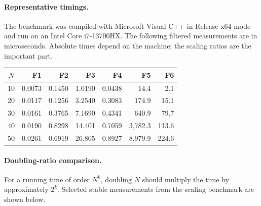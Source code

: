 \documentclass[12pt,a4paper]{article}
\begin{document}
\paragraph{Representative timings.}
The benchmark was compiled with Microsoft Visual C++ in Release x64 mode
and run on an Intel Core i7-13700HX. The following filtered measurements
are in microseconds. Absolute times depend on the machine; the scaling
ratios are the important part.

\begin{center}
\begin{tabular}{c|r|r|r|r|r|r}
$N$ & \textbf{F1} & \textbf{F2} & \textbf{F3} &
\textbf{F4} & \textbf{F5} & \textbf{F6} \\
\hline
10 & 0.0073 & 0.1450 & 1.0190 & 0.0438 & 14.4 & 2.1 \\
20 & 0.0117 & 0.1256 & 3.2540 & 0.3083 & 174.9 & 15.1 \\
30 & 0.0161 & 0.3765 & 7.1690 & 0.4341 & 640.9 & 79.7 \\
40 & 0.0190 & 0.8298 & 14.401 & 0.7059 & 3{,}782.3 & 113.6 \\
50 & 0.0261 & 0.6919 & 26.805 & 0.8927 & 8{,}979.9 & 224.6
\end{tabular}
\end{center}

\paragraph{Doubling-ratio comparison.}
For a running time of order $N^k$, doubling $N$ should multiply the time
by approximately $2^k$. Selected stable measurements from the scaling
benchmark are shown below.

\begin{center}
\end{center}
\end{document}
